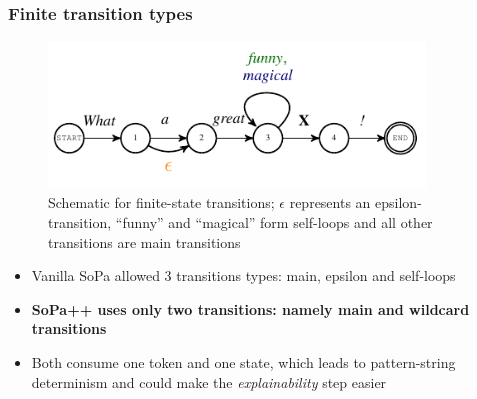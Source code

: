 \documentclass[10pt]{beamer}
\let\oldcitep=\citep
\renewcommand\citep[1]{{\textcolor{blue}{\oldcitep{#1}}}}
\begin{document}
\subsection{}
\begin{frame}
  \frametitle{Finite transition types}
  \begin{figure}
    \captionsetup{justification=centering}
    \includegraphics[width=10cm]{pdfs/borrowed/linear_fsa_special_transitions.pdf}
    \caption{Schematic for finite-state transitions; $\epsilon$ represents an
      epsilon-transition, ``funny'' and ``magical'' form self-loops and all
      other transitions are main transitions \citep{schwartz2018sopa}}
  \end{figure}
  \begin{itemize}
    \item Vanilla SoPa allowed 3 transitions types: main, epsilon and self-loops
    \item \textbf{SoPa++ uses only two transitions: namely main and wildcard
      transitions}
    \item Both consume one token and one state, which leads to pattern-string
    determinism and could make the \textit{explainability} step easier
  \end{itemize}
\end{frame}
\end{document}
